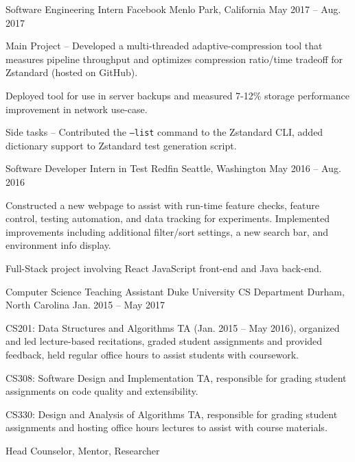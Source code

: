 \begin{cventries}
  \cventry
    {Software Engineering Intern}
    {Facebook}
    {Menlo Park, California}
    {May 2017 -- Aug. 2017}
    {
      \begin{cvitems}
        \item {Main Project -- Developed a multi-threaded adaptive-compression tool that measures pipeline throughput and optimizes compression ratio/time tradeoff for Zstandard (hosted on GitHub).}
        \item {Deployed tool for use in server backups and measured 7-12\% storage performance improvement in network use-case.}
        \item {Side tasks -- Contributed the \texttt{--list} command to the Zstandard CLI, added dictionary support to Zstandard test generation script.}
      \end{cvitems}
    }
  \cventry
    {Software Developer Intern in Test}
    {Redfin}
    {Seattle, Washington}
    {May 2016 -- Aug. 2016}
    {
      \begin{cvitems}
        \item {Constructed a new webpage to assist with run-time feature checks, feature control, testing automation, and data tracking for experiments. Implemented improvements including additional filter/sort settings, a new search bar, and environment info display.}
        \item {Full-Stack project involving React JavaScript front-end and Java back-end.}
      \end{cvitems}
    }
  \cventry
    {Computer Science Teaching Assistant}
    {Duke University CS Department}
    {Durham, North Carolina}
    {Jan. 2015 -- May 2017}
    {
      \begin{cvitems}
        \item {CS201: Data Structures and Algorithms TA (Jan. 2015 -- May 2016), organized and led lecture-based recitations, graded student assignments and provided feedback, held regular office hours to assist students with coursework.}
        \item {CS308: Software Design and Implementation TA, responsible for grading student assignments on code quality and extensibility.}
        \item {CS330: Design and Analysis of Algorithms TA, responsible for grading student assignments and hosting office hours lectures to assist with course materials.}
      \end{cvitems}
    }
  \cventry
    {Head Counselor, Mentor, Researcher}

\end{cventries}
